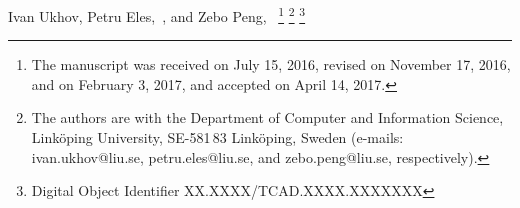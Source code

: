 Ivan Ukhov,
Petru Eles,~, and
Zebo Peng,~
\vspace{-2.5em}
\thanks{
  The manuscript was received on July 15, 2016, revised on November 17, 2016,
  and on February 3, 2017, and accepted on April 14, 2017.
}%
\thanks{
  The authors are with the Department of Computer and Information Science,
  Link\"{o}ping University, SE-581\,83 Link\"{o}ping, Sweden (e-mails:
  ivan.ukhov@liu.se, petru.eles@liu.se, and zebo.peng@liu.se, respectively).
}%
\thanks{
  Digital Object Identifier XX.XXXX/TCAD.XXXX.XXXXXXX
}%
